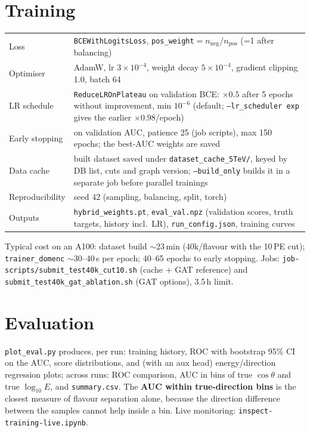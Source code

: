 \documentclass[11pt,a4paper]{article}
\newcommand{\code}[1]{\texttt{#1}}
\begin{document}
\section{Training}
\begin{tabularx}{\textwidth}{lY}
\toprule
Loss & \code{BCEWithLogitsLoss}, \code{pos\_weight}$=n_\mathrm{neg}/n_\mathrm{pos}$ (=1 after balancing)\\
Optimiser & AdamW, lr $3\times10^{-4}$, weight decay $5\times10^{-4}$, gradient clipping 1.0, batch 64\\
LR schedule & \code{ReduceLROnPlateau} on validation BCE: $\times0.5$ after 5 epochs without improvement, min $10^{-6}$
               (default; \code{--lr\_scheduler exp} gives the earlier $\times0.98$/epoch)\\
Early stopping & on validation AUC, patience 25 (job scripts), max 150 epochs; the best-AUC weights are saved\\
Data cache & built dataset saved under \code{dataset\_cache\_5TeV/}, keyed by DB list, cuts and graph version;
             \code{--build\_only} builds it in a separate job before parallel trainings\\
Reproducibility & seed 42 (sampling, balancing, split, torch)\\
Outputs & \code{hybrid\_weights.pt}, \code{eval\_val.npz} (validation scores, truth targets, history incl.\ LR),
          \code{run\_config.json}, training curves\\
\bottomrule
\end{tabularx}

\medskip
Typical cost on an A100: dataset build $\sim$23\,min (40k/flavour with the 10\,PE cut); \code{trainer\_domenc}
$\sim$30--40\,s per epoch; 40--65 epochs to early stopping. Jobs: \code{job-scripts/submit\_test40k\_cut10.sh} (cache +
GAT reference) and \code{submit\_test40k\_gat\_ablation.sh} (GAT options), 3.5\,h limit.

\section{Evaluation}\label{sec:eval}
\code{plot\_eval.py} produces, per run: training history, ROC with bootstrap 95\% CI on the AUC, score distributions,
and (with an aux head) energy/direction regression plots; across runs: ROC comparison, AUC in bins of true
$\cos\theta$ and true $\log_{10}E$, and \code{summary.csv}. The \textbf{AUC within true-direction bins} is the closest
measure of flavour separation alone, because the direction difference between the samples cannot help inside a bin.
Live monitoring: \code{inspect-training-live.ipynb}.
\end{document}

